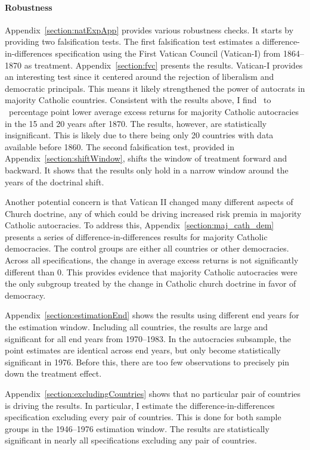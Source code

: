 \documentclass[12pt]{article}
\numberwithin{equation}{section}
\begin{document}
\paragraph{Robustness} 

Appendix~\ref{section:natExpApp} provides various robustness checks. It starts by providing two falsification tests. The first falsification test estimates a difference-in-differences specification using the First Vatican Council (Vatican-I) from 1864--1870 as treatment. Appendix~\ref{section:fvc} presents the results. Vatican-I provides an interesting test since it centered around the rejection of liberalism and democratic principals. This means it likely strengthened the power of autocrats in majority Catholic countries. Consistent with the results above, I find \tabCEightLow\ to \tabCEightHigh\ percentage point lower average excess returns for majority Catholic autocracies in the 15 and 20 years after 1870. The results, however,  are statistically insignificant. This is likely due to there being only 20 countries with data available before 1860. The second falsification test, provided in Appendix~\ref{section:shiftWindow}, shifts the window of treatment forward and backward. It shows that the results only hold in a narrow window around the years of the doctrinal shift.

Another potential concern is that Vatican II changed many different aspects of Church doctrine, any of which could be driving increased risk premia in majority Catholic autocracies. To address this, Appendix~\ref{section:maj_cath_dem} presents a series of difference-in-differences results for majority Catholic democracies. The control groups are either all countries or other democracies. Across all specifications, the change in average excess returns is not significantly different than 0. This provides evidence that majority Catholic autocracies were the only subgroup treated by the change in Catholic church doctrine in favor of democracy.

Appendix~\ref{section:estimationEnd} shows the results using different end years for the estimation window.  Including all countries, the results are large and significant for all end years from 1970--1983. In the autocracies subsample, the point estimates are identical across end years, but only become statistically significant in 1976. Before this, there are too few observations to precisely pin down the treatment effect.

Appendix~\ref{section:excludingCountries} shows that no particular pair of countries is driving the results. In particular, I estimate the difference-in-differences specification excluding every pair of countries. This is done for both sample groups in the 1946--1976 estimation window. The results are statistically significant in nearly all specifications excluding any pair of countries.
\end{document}
